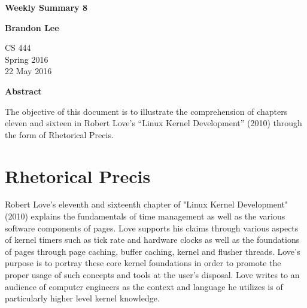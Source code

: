 \documentclass[letterpaper,10pt,titlepage]{article}
\begin{document}
\begin{titlepage}
    \begin{center}
        \vspace*{3.5cm}

        \textbf{Weekly Summary 8}

        \vspace{0.5cm}

        \textbf{Brandon Lee}

        \vspace{0.8cm}

        CS 444\\
        Spring 2016\\
        22 May 2016\\

        \vspace{1cm}

        \textbf{Abstract}\\

        \vspace{0.5cm}

        The objective of this document is to illustrate the comprehension of chapters eleven and sixteen in Robert Love's “Linux Kernel Development” (2010) through the form of Rhetorical Precis.


        \vfill



    \end{center}
\end{titlepage}

\newpage

\section{Rhetorical Precis}

Robert Love's eleventh and sixteenth chapter of "Linux Kernel Development" (2010) explains the fundamentals of time management as well as the various software components of pages. Love supports his claims through various aspects of kernel timers such as tick rate and hardware clocks as well as the foundations of pages through page caching, buffer caching, kernel and flusher threads. Love's purpose is to portray these core kernel foundations in order to promote the proper usage of such concepts and tools at the user's disposal. Love writes to an audience of computer engineers as the context and language he utilizes is of particularly higher level kernel knowledge.
\end{document}
